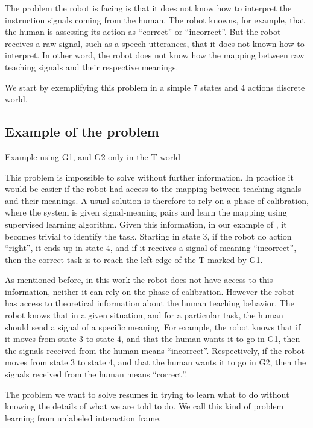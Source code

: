 The problem the robot is facing is that it does not know how to interpret the instruction signals coming from the human. The robot knowns, for example, that the human is assessing its action as ``correct'' or ``incorrect''. But the robot receives a raw signal, such as a speech utterances, that it does not known how to interpret. In other word, the robot does not know how the mapping between raw teaching signals and their respective meanings.

We start by exemplifying this problem in a simple 7 states and 4 actions discrete world.

\subsection{Example of the problem}

Example using G1, and G2 only in the T world


\transition

This problem is impossible to solve without further information. In practice it would be easier if the robot had access to the mapping between teaching signals and their meanings. A usual solution is therefore to rely on a phase of calibration, where the system is given signal-meaning pairs and learn the mapping using supervised learning algorithm. Given this information, in our example of , it becomes trivial to identify the task. Starting in state 3, if the robot do action ``right'', it ends up in state 4, and if it receives a signal of meaning ``incorrect'', then the correct task is to reach the left edge of the T marked by G1.

As mentioned before, in this work the robot does not have access to this information, neither it can rely on the phase of calibration. However the robot has access to theoretical information about the human teaching behavior. The robot knows that in a given situation, and for a particular task, the human should send a signal of a specific meaning. For example, the robot knows that if it moves from state 3 to state 4, and that the human wants it to go in G1, then the signals received from the human means ``incorrect''. Respectively, if the robot moves from state 3 to state 4, and that the human wants it to go in G2, then the signals received from the human means ``correct''.

The problem we want to solve resumes in trying to learn what to do without knowing the details of what we are told to do. We call this kind of problem learning from unlabeled interaction frame. 

